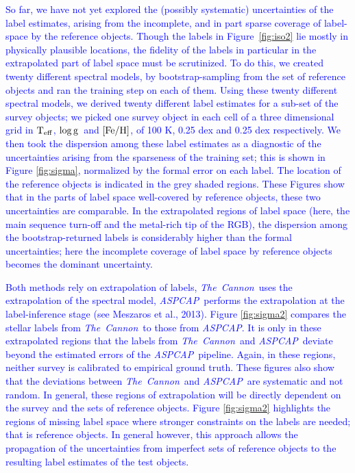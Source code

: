 \documentclass[12pt, preprint]{aastex}
\newcommand{\tc}{\textsl{The~Cannon}}
\newcommand{\aspcap}{\textsl{ASPCAP}}
\newcommand{\teff}{\mbox{$\rm T_{eff}$}}
\newcommand{\feh}{\mbox{$\rm [Fe/H]$}}
\newcommand{\logg}{\mbox{$\rm \log g$}}
\begin{document}
\textcolor{blue}{So far, we have not yet explored the (possibly systematic) uncertainties of the label estimates, arising from the incomplete, and in part sparse coverage of label-space by the reference objects. Though the labels in Figure~\ref{fig:iso2} lie mostly in physically plausible locations, the fidelity of the labels in particular in the extrapolated part of label space must be scrutinized. To do this, we created twenty different spectral models, by bootstrap-sampling from the set of reference objects and ran the training step on each of them. Using these twenty different spectral models, we derived twenty different label estimates for a sub-set of the survey objects;  we picked one survey object in each cell of a three dimensional grid in \teff, \logg\ and \feh, of 100 K, 0.25 dex and 0.25 dex respectively. We then took the dispersion among these label estimates as a diagnostic of the uncertainties arising from the sparseness of the training set; this is shown in Figure \ref{fig:sigma}, normalized by the formal error on each label. The location of the reference objects is indicated in the grey shaded regions. These Figures show that in the parts of label space well-covered by reference objects, these two uncertainties are comparable. In the extrapolated regions of label space (here, the main sequence turn-off and the metal-rich tip of the RGB), the dispersion among the bootstrap-returned labels is considerably higher than the formal uncertainties; here the incomplete coverage of label space by reference objects becomes the dominant uncertainty. }

\textcolor{blue}{Both methods rely on extrapolation of labels, \tc\ uses the extrapolation of the spectral model,  \aspcap\ performs the extrapolation at the label-inference stage (see Meszaros et al., 2013). Figure \ref{fig:sigma2} compares the stellar labels from \tc\ to those from \aspcap. It is only in these extrapolated regions that the labels from \tc\ and \aspcap\ deviate beyond the estimated errors of the \aspcap\ pipeline. Again, in these regions, neither survey is calibrated to empirical ground truth. These figures also show that the deviations between \tc\ and \aspcap\ are systematic and not random. In general, these regions of extrapolation will be directly dependent on the survey and the sets of reference objects.  Figure  \ref{fig:sigma2} highlights the regions of missing label space where stronger constraints on the labels are needed; that is reference objects. In general however, this approach allows the propagation of the uncertainties from imperfect sets of reference objects to the resulting label estimates of the test objects. }
\end{document}
